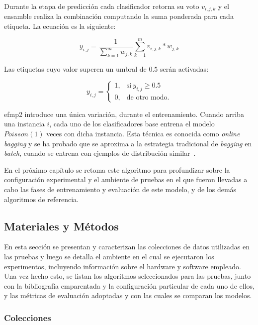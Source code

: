 Durante la etapa de predicción cada clasificador retorna su voto $v_{i,j,k}$ y
el ensamble realiza la combinación computando la suma ponderada para cada
etiqueta. La ecuación es la siguiente:

\begin{equation}
	y_{i,j} = \frac{1}{\sum_{k=1}^{m} w_{j,k}} \sum_{k=1}^{m} v_{i,j,k} *
	w_{j,k}
\end{equation}

Las etiquetas cuyo valor superen un umbral de $0.5$ serán activadas:

\begin{equation}
	y_{i,j} =
	\begin{cases}
		1, & \text{si}\ y_{i,j} \geq 0.5 \\
		0, & \text{de otro modo.}
	\end{cases}
\end{equation}

\acrshort{efmp2} introduce una única variación, durante el entrenamiento. Cuando
arriba una instancia $i$, cada uno de los clasificadores base entrena el modelo
$Poisson(1)$ veces con dicha instancia. Esta técnica es conocida como
\textit{online bagging} y se ha probado que se aproxima a la estrategia
tradicional de \textit{bagging} en \textit{batch}, cuando se entrena con
ejemplos de distribución similar~\cite{oza_online_2005}.

En el próximo capítulo se retoma este algoritmo para profundizar sobre la
configuración experimental y el ambiente de pruebas en el que fueron llevadas a
cabo las fases de entrenamiento y evaluación de este modelo, y de los demás
algoritmos de referencia.

\subsection{Materiales y Métodos}
\label{materiales_y_metodos}

En esta sección se presentan y caracterizan las colecciones de datos utilizadas
en las pruebas y luego se detalla el ambiente en el cual se ejecutaron los
experimentos, incluyendo información sobre el hardware y software empleado. Una
vez hecho esto, se listan los algoritmos seleccionados para las pruebas, junto
con la bibliografía emparentada y la configuración particular de cada uno de
ellos, y las métricas de evaluación adoptadas y con las cuales se comparan los
modelos.

\subsubsection{Colecciones}

